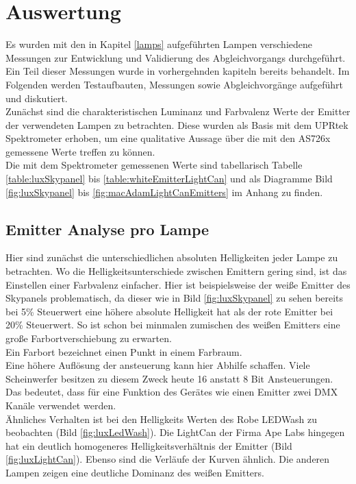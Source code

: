 \documentclass[11pt]{scrartcl}
\begin{document}
\section{Auswertung}
Es wurden mit den in Kapitel \ref{lamps} aufgeführten Lampen verschiedene Messungen zur Entwicklung und Validierung des Abgleichvorgangs durchgeführt.\\
Ein Teil dieser Messungen wurde in vorhergehnden kapiteln bereits behandelt. Im Folgenden werden Testaufbauten, Messungen sowie Abgleichvorgänge aufgeführt
und diskutiert.\\
Zunächst sind die charakteristischen Luminanz und Farbvalenz Werte der Emitter der verwendeten Lampen zu betrachten. Diese wurden als Basis mit dem UPRtek
Spektrometer erhoben, um eine qualitative Aussage über die mit den AS726x gemessene Werte treffen zu können.\\
Die mit dem Spektrometer gemessenen Werte sind tabellarisch Tabelle \ref{table:luxSkypanel} bis \ref{table:whiteEmitterLightCan} und als Diagramme Bild
\ref{fig:luxSkypanel} bis \ref{fig:macAdamLightCanEmitters} im Anhang zu finden.
\subsection{Emitter Analyse pro Lampe} \label{emitterColorDrit}
Hier sind zunächst die unterschiedlichen absoluten Helligkeiten jeder Lampe zu betrachten. Wo die Helligkeitsunterschiede zwischen Emittern gering sind, ist
das Einstellen einer Farbvalenz einfacher. Hier ist beispielsweise der weiße Emitter des Skypanels problematisch, da dieser wie in Bild \ref{fig:luxSkypanel} 
zu sehen bereits bei 5\% Steuerwert eine höhere absolute Helligkeit hat als der rote Emitter bei 20\% Steuerwert. So ist schon bei minmalen zumischen des weißen
Emitters eine große Farbortverschiebung zu erwarten.\\
Ein Farbort bezeichnet einen Punkt in einem Farbraum.\\
Eine höhere Auflösung der ansteuerung kann hier Abhilfe schaffen. Viele Scheinwerfer besitzen zu diesem Zweck heute 16 anstatt 8 Bit Ansteuerungen. Das bedeutet,
dass für eine Funktion des Gerätes wie einen Emitter zwei DMX Kanäle verwendet werden.\\
Ähnliches Verhalten ist bei den Helligkeits Werten des Robe LEDWash zu beobachten (Bild \ref{fig:luxLedWash}). Die LightCan der Firma Ape Labs hingegen hat ein
deutlich homogeneres Helligkeitsverhältnis der Emitter (Bild \ref{fig:luxLightCan}). Ebenso sind die Verläufe der Kurven ähnlich. Die anderen Lampen zeigen eine
deutliche Dominanz des weißen Emitters.
\end{document}
